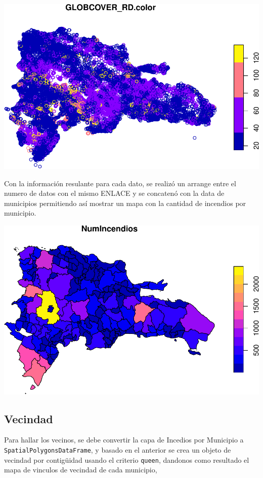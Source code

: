 \documentclass[11pt,]{article}
\begin{document}
\includegraphics{proyecto_files/figure-latex/unnamed-chunk-6-1.pdf}

Con la información resulante para cada dato, se realizó un arrange entre
el numero de datos con el mismo ENLACE y se concatenó con la data de
municipios permitiendo así mostrar un mapa con la cantidad de incendios
por municipio.

\includegraphics{proyecto_files/figure-latex/unnamed-chunk-8-1.pdf}

\subsection{Vecindad}\label{vecindad}

Para hallar los vecinos, se debe convertir la capa de Incedios por
Municipio a \texttt{SpatialPolygonsDataFrame}, y basado en el anterior
se crea un objeto de vecindad por contigüidad usando el criterio
\texttt{queen}, dandonos como resultado el mapa de vinculos de vecindad
de cada municipio,
\end{document}
